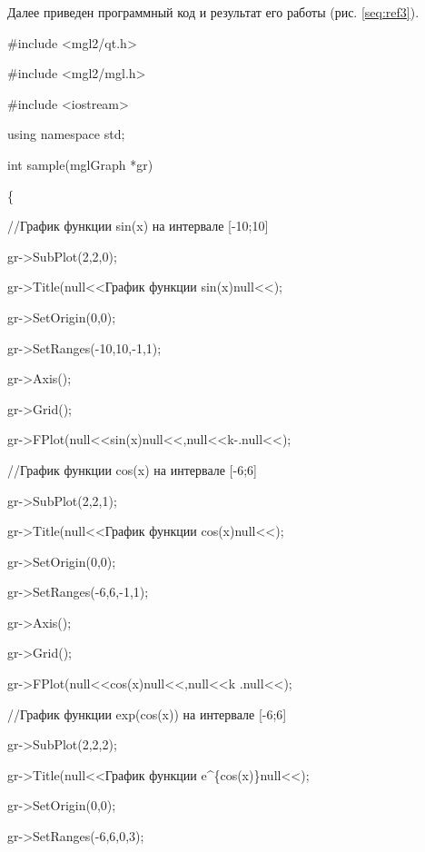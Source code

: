 Далее приведен программный код и результат его работы (рис. \ref{seq:ref3}).

{\upshape
\#include {\textless}mgl2/qt.h{\textgreater}}

{\upshape
\#include {\textless}mgl2/mgl.h{\textgreater}}

{\upshape
\#include {\textless}iostream{\textgreater}}

{\upshape
using namespace std;}

{\upshape
int sample(mglGraph *gr)}

{\upshape
\{}

{\upshape
//График функции sin(x) на интервале [-10;10]}

{\upshape
gr-{\textgreater}SubPlot(2,2,0); }

{\upshape
gr-{\textgreater}Title(null{<<}График функции sin(x)null{<<});}

{\upshape
gr-{\textgreater}SetOrigin(0,0);}

{\upshape
gr-{\textgreater}SetRanges(-10,10,-1,1);}

{\upshape
gr-{\textgreater}Axis(); }

{\upshape
gr-{\textgreater}Grid(); }

{\upshape
gr-{\textgreater}FPlot(null{<<}sin(x)null{<<},null{<<}k-.null{<<});}

{\upshape
//График функции cos(x) на интервале [-6;6]}

{\upshape
gr-{\textgreater}SubPlot(2,2,1); }

{\upshape
gr-{\textgreater}Title(null{<<}График функции cos(x)null{<<});}

{\upshape
gr-{\textgreater}SetOrigin(0,0);}

{\upshape
gr-{\textgreater}SetRanges(-6,6,-1,1);}

{\upshape
gr-{\textgreater}Axis(); }

{\upshape
gr-{\textgreater}Grid(); }

{\upshape
gr-{\textgreater}FPlot(null{<<}cos(x)null{<<},null{<<}k .null{<<});}

{\upshape
//График функции exp(cos(x)) на интервале [-6;6]}

{\upshape
gr-{\textgreater}SubPlot(2,2,2);}

{\upshape
gr-{\textgreater}Title(null{<<}График функции e\^{}\{cos(x)\}null{<<});}

{\upshape
gr-{\textgreater}SetOrigin(0,0);}

{\upshape
gr-{\textgreater}SetRanges(-6,6,0,3);}

